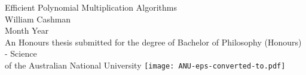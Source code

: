 \begin{titlepage}
\begin{center}

\vspace*{\fill} \Huge
Efficient Polynomial Multiplication Algorithms                        
\\
\vfill\vfill\Large
William Cashman
\\
\vfill\vfill
                          Month Year
\\
\vfill\vfill \normalsize
An Honours thesis submitted for the degree of Bachelor of Philosophy (Honours) - Science\\
         of the Australian National University
\vfill
         \texttt{[image: ANU-eps-converted-to.pdf]}

\end{center}

\end{titlepage}
